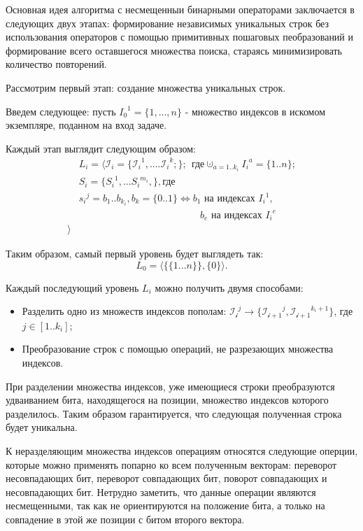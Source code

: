 \label{binary}

Основная идея алгоритма с несмещенныи бинарными операторами заключается в следующих двух этапах: формирование независимых уникальных строк без использования операторов 
с помощью примитивных пошаговых пеобразований и формирование всего оставшегося множества поиска, стараясь минимизировать количество повторений. 

Рассмотрим первый этап: создание множества уникальных строк.

Введем следующее: пусть ${I_0}^1 = \{1,\ldots, n\}$ - множество индексов в искомом экземпляре, поданном на вход задаче. 

Каждый этап выглядит следующим образом: 
\begin{align*}
& L_i = \langle \mathcal{I}_i = \{{\mathcal{I}_{i}}^{1},....{\mathcal{I}_{i}}^{k};\}; \:\: \textrm{где}  \cupdot_{a = 1..k_i} {I_i}^a = \{ 1..n \}; \\
& S_i = \{ {S_i}^1, ... {S_i}^{m_i}, \}, \textrm{где}  \\ 
&{s_i}^j = b_1..b_{k_i}, b_k = \{ 0..1  \}  \Longleftrightarrow b_1 \textrm{ на индексах } {I_{i}}^1, \\ & \:\:\:\:\:\:\:\:\:\:\:\:\:\:\:\:\:\:\:\:\:\:\:\:\:\:\:\:\:\:\:\:\:\:\:\:\:\:\:\:\:\:\:\:\:\:\:\:\:\:\:\:\:\:\:\: b_e \textrm{ на индексах } {I_{i}}^e\\
 \rangle
\end{align*}

Таким образом, самый первый уровень будет выглядеть так: 
$$L_0 = \langle \{\{ 1...n \}\}, \{0\} \rangle.$$

Каждый последующий уровень $L_i$ можно получить двумя способами: 
\begin{itemize}
   \item Разделить одно из множеств индексов пополам: $ \mathcal{{I}_i}^j \to \{\mathcal{{I}_{i+1}}^j, \mathcal{{I}_{i+1}}^{k_i+1}\} $, где $j \in [1..k_i]$;
   \item Преобразование строк с помощью операций, не разрезающих множества индексов.
\end{itemize}

При разделении множества индексов, уже имеющиеся строки преобразуются удваиванием бита, находящегося на позиции, множество индексов которого разделилось.
Таким образом гарантируется, что следующая полученная строка будет уникальна.

К неразделяющим множества индексов операциям относятся следующие оперции, которые можно применять попарно ко всем полученным векторам: 
переворот несовпадающих бит, переворот совпадающих бит, поворот совпадающих и несовпадающих бит. 
Нетрудно заметить, что данные операции являются несмещенными, так как не ориентируются на положение бита, а только на совпадение в этой же позиции с битом второго вектора. 

